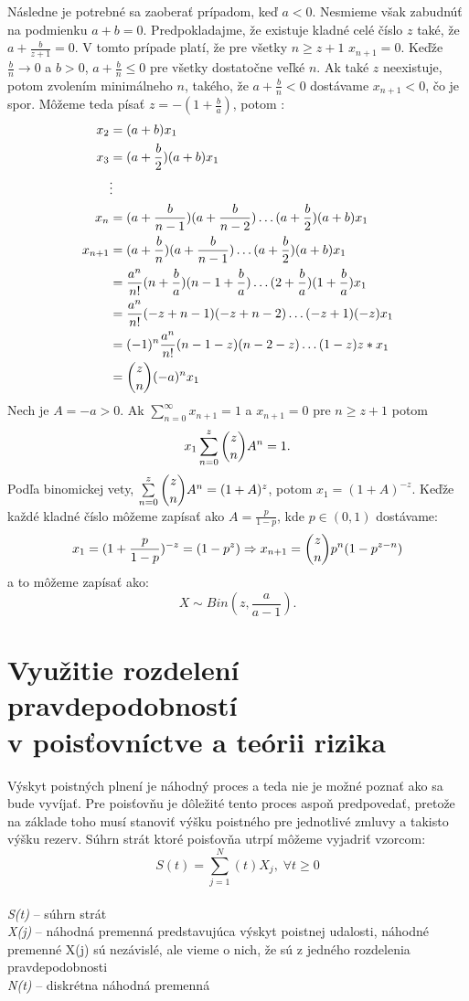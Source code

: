 \documentclass[a4paper,10pt]{article}
\theoremstyle{plain}
\theoremstyle{definition}
\begin{document}
Následne je potrebné sa zaoberať prípadom, keď $ a<0 $. Nesmieme však zabudnúť na podmienku $ a+b=0 $.
Predpokladajme, že existuje kladné celé číslo $ z $ také, že $ a + \frac{b}{z+1} = 0 $. V tomto prípade
platí, že pre všetky $ n\geq z+1  $ $ x_{n+1} = 0 $.
Keďže $ \frac{b}{n} \rightarrow 0$ a $ b>0 $, $a + \frac{b}{n} \leq 0$ pre všetky dostatočne veľké $ n $. Ak také $ z $ neexistuje, potom zvolením minimálneho $ n $, takého, že $ a + \frac{b}{n} < 0 $ dostávame $ x_{n+1}<0 $, čo je spor.
Môžeme teda písať $ z = -(1+\frac{b}{a}) $, potom :
\begin{align*}
x_{2}&=(a+b)\*x_{1} \\
x_{3}&=(a + \frac{b}{2}) \* (a + b)\*x_{1}\\
&\vdots \\
x_{n} &= (a+\frac{b}{n-1})\*(a+\frac{b}{n-2})\ldots  (a + \frac{b}{2})\*(a+b)\*x_{1}\\
x_{n+1} &= (a + \frac{b}{n})\*(a + \frac{b}{n-1})\ldots (a + \frac{b}{2})\*(a+b)\*x_{1}\\
&= \frac{a^{n}}{n!}\*(n + \frac{b}{a})\*(n-1+\frac{b}{a}) \ldots (2+\frac{b}{a})\*(1+\frac{b}{a})\*x_{1} \\
&= \frac{a^{n}}{n!}\*(-z+n-1)\*(-z+n-2) \ldots (-z+1)\*(-z)\*x_{1} \\
&= (-1)^{n}\*\frac{a^{n}}{n!}\*(n-1-z)\*(n-2-z)\ldots(1-z)\*z*x_{1} \\
&= \dbinom{z}{n}\*(-a)^{n}\*x_{1}  \\
\end{align*}\newpage
\noindent Nech je $ A = -a >0 $. Ak $ \sum\limits_{n=0}^\infty x_{n+1} = 1 $ a $ x_{n+1} = 0 $ pre $ n\geq z+1 $ potom 
$$ x_{1} \sum\limits_{n=0}^z \dbinom{z}{n} A^{n}= 1 \text{.}$$
\noindent Podľa binomickej vety, $ \sum\limits_{n=0}^z \dbinom{z}{n} A^{n}= (1+A)^{z} $, potom $ x_{1} = (1+A)^{-z} $.
Keďže každé kladné číslo môžeme zapísať ako $ A = \frac{p}{1-p} $, kde $ p \in (0,1) $ dostávame: 
$$ x_{1} = (1 + \frac{p}{1-p})^{-z} = (1-p^{z}) \Rightarrow x_{n+1} = \dbinom{z}{n}\*p^{n}\*(1-p^{z-n}) $$ a to 
môžeme zapísať ako: $$ X \sim Bin(z,\frac{a}{a-1}) \text{.}$$%
\newpage %
\section{Využitie rozdelení pravdepodobností\\
 v poisťovníctve a teórii rizika} %
Výskyt poistných plnení je náhodný proces a teda nie je možné poznať ako sa bude vyvíjať. Pre poisťovňu je dôležité tento proces aspoň predpovedať, pretože na základe toho musí stanoviť výšku poistného pre jednotlivé zmluvy a takisto výšku rezerv. 
Súhrn strát ktoré poisťovňa utrpí môžeme vyjadriť vzorcom:
$$ S(t) = \sum\limits_{j=1}^N(t) X_{j},\; \forall t\geq0 $$\\
\textit{S(t)} – súhrn strát \\
\textit{X(j)} – náhodná premenná predstavujúca výskyt poistnej udalosti, náhodné premenné X(j) sú nezávislé, ale vieme o nich, že sú  z jedného rozdelenia pravdepodobnosti\\
\textit{N(t)} – diskrétna náhodná premenná\\
\end{document}
